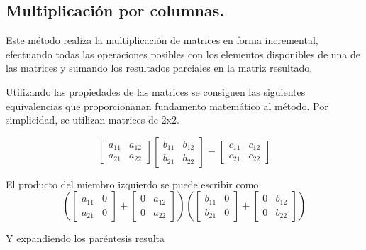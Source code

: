 \documentclass[a4paper,10pt]{article}
\begin{document}
\subsection{Multiplicación por columnas.}

Este método realiza la multiplicación de matrices en forma incremental, efectuando todas las operaciones posibles con los elementos disponibles de una de las matrices y sumando los resultados parciales en la matriz resultado.

Utilizando las propiedades de las matrices se consiguen las siguientes equivalencias que proporcionanan fundamento matemático al método. Por simplicidad, se utilizan matrices de 2x2.

$$
  \left[
	\begin{array}{cc}
		a_{11} & a_{12} \\
		a_{21} & a_{22}
	\end{array}
   \right]
   \left[
	\begin{array}{cc}
		b_{11} & b_{12} \\
		b_{21} & b_{22}
	\end{array}
   \right]
   =
   \left[
	\begin{array}{cc}
		c_{11} & c_{12} \\
		c_{21} & c_{22}
	\end{array}
   \right]
$$

El producto del miembro izquierdo se puede escribir como
$$
   \left(
	\left[
	\begin{array}{cc}
		a_{11} & 0 \\
		a_{21} & 0
	\end{array}
	\right]
        +
	\left[
	\begin{array}{cc}
		0 & a_{12} \\
		0 & a_{22}
	\end{array}
	\right]
   \right)
   \left(
   	\left[
	\begin{array}{cc}
		b_{11} & 0 \\
		b_{21} & 0
	\end{array}
	\right]
        +
	\left[
	\begin{array}{cc}
		0 & b_{12} \\
		0 & b_{22}
	\end{array}
	\right]
   \right)
$$

Y expandiendo los paréntesis resulta
\end{document}
